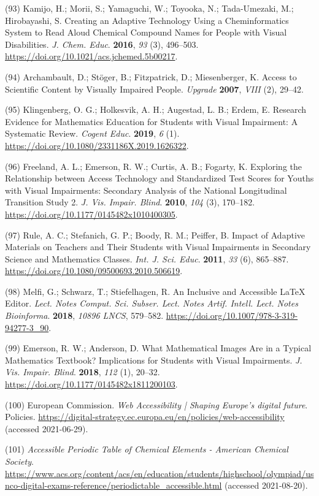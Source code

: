 \documentclass[11.5pt]{sig-alternate} %
\begin{document}
(93)	Kamijo, H.; Morii, S.; Yamaguchi, W.; Toyooka, N.; Tada-Umezaki, M.; Hirobayashi, S. Creating an Adaptive Technology Using a Cheminformatics System to Read Aloud Chemical Compound Names for People with Visual Disabilities. \textit{J. Chem. Educ}. \textbf{2016}, \textit{93} (3), 496–503. \url{https://doi.org/10.1021/acs.jchemed.5b00217}.

(94)	Archambault, D.; Stöger, B.; Fitzpatrick, D.; Miesenberger, K. Access to Scientific Content by Visually Impaired People. \textit{Upgrade} \textbf{2007}, \textit{VIII} (2), 29–42.

(95)	Klingenberg, O. G.; Holkesvik, A. H.; Augestad, L. B.; Erdem, E. Research Evidence for Mathematics Education for Students with Visual Impairment: A Systematic Review. \textit{Cogent Educ}. \textbf{2019}, \textit{6} (1). \url{https://doi.org/10.1080/2331186X.2019.1626322}.

(96)	Freeland, A. L.; Emerson, R. W.; Curtis, A. B.; Fogarty, K. Exploring the Relationship between Access Technology and Standardized Test Scores for Youths with Visual Impairments: Secondary Analysis of the National Longitudinal Transition Study 2. \textit{J. Vis. Impair. Blind}. \textbf{2010}, \textit{104} (3), 170–182. \url{https://doi.org/10.1177/0145482x1010400305}.

(97)	Rule, A. C.; Stefanich, G. P.; Boody, R. M.; Peiffer, B. Impact of Adaptive Materials on Teachers and Their Students with Visual Impairments in Secondary Science and Mathematics Classes. \textit{Int. J. Sci. Educ}. \textbf{2011}, \textit{33} (6), 865–887. \url{https://doi.org/10.1080/09500693.2010.506619}.

(98)	Melfi, G.; Schwarz, T.; Stiefelhagen, R. An Inclusive and Accessible LaTeX Editor. \textit{Lect. Notes Comput. Sci. Subser. Lect. Notes Artif. Intell. Lect. Notes Bioinforma}. \textbf{2018}, \textit{10896 LNCS}, 579–582. \url{https://doi.org/10.1007/978-3-319-94277-3_90}.

(99)	Emerson, R. W.; Anderson, D. What Mathematical Images Are in a Typical Mathematics Textbook? Implications for Students with Visual Impairments. \textit{J. Vis. Impair. Blind}. \textbf{2018}, \textit{112} (1), 20–32. \url{https://doi.org/10.1177/0145482x1811200103}.

(100)	European Commission. \textit{Web Accessibility | Shaping Europe’s digital future}. Policies. \url{https://digital-strategy.ec.europa.eu/en/policies/web-accessibility} (accessed 2021-06-29).

(101)	\textit{Accessible Periodic Table of Chemical Elements - American Chemical Society}. \url{https://www.acs.org/content/acs/en/education/students/highschool/olympiad/usnco-digital-exams-reference/periodictable_accessible.html} (accessed 2021-08-20).
\end{document}
